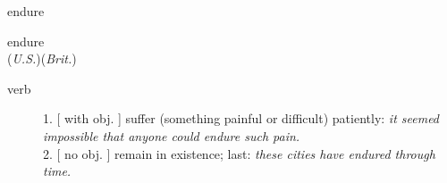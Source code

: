 \documentclass[avery5372, grid]{flashcards}
\begin{document}
\begin{flashcard}{\Huge endure}
	\begin{center}
		{\LARGE en\textbullet dure}\\
		(\textit{U.S.})\hspace{0.25cm}(\textit{Brit.})
	\end{center}
	\begin{description}
		
		\item[verb] %
			
			1. [ with obj. ] suffer (something painful or difficult) patiently: \textit{it seemed impossible that anyone could endure such pain.}\\
			
			2. [ no obj. ] remain in existence; last: \textit{these cities have endured through time.}\\
			
		
			
			
			
		

\end{description}
\end{flashcard}
\end{document}
